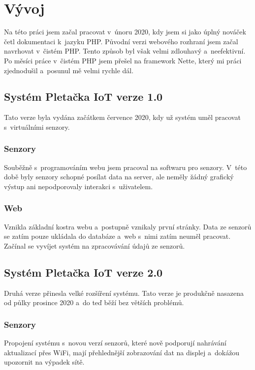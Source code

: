 \chapter{Vývoj}
Na této práci jsem začal pracovat v~únoru 2020, kdy jsem si jako úplný nováček četl dokumentaci k~jazyku PHP. 
Původní verzi webového rozhraní jsem začal navrhovat v~čistém PHP. Tento způsob byl však velmi zdlouhavý a~neefektivní.
Po měsíci práce v~čistém PHP jsem přešel na framework Nette, který mi práci zjednodušil a~posunul mě velmi rychle dál. 


\section{Systém Pletačka IoT verze 1.0}
Tato verze byla vydána začátkem července 2020, kdy už systém uměl pracovat s~virtuálními senzory.


\subsection{Senzory}
Souběžně s~programováním webu jsem pracoval na softwaru pro senzory.
V~této době byly senzory schopné posílat data na server, ale neměly žádný grafický výstup ani nepodporovaly interakci s~uživatelem.

\subsection{Web}
Vznikla základní kostra webu a~postupně vznikaly první stránky.
Data ze senzorů se zatím pouze ukládala do databáze a~web s~nimi zatím neuměl pracovat.
Začínal se vyvíjet systém na zpracovávání údajů ze senzorů.



\section{Systém Pletačka IoT verze 2.0}
Druhá verze přinesla velké rozšíření systému.
Tato verze je produkčně nasazena od půlky prosince 2020 a~do teď běží bez větších problémů.


\subsection{Senzory}
Propojení systému s~novou verzí senzorů, které nově podporují nahrávání aktualizací přes WiFi, mají přehlednější zobrazování dat na displej a~dokážou upozornit na výpadek sítě.



